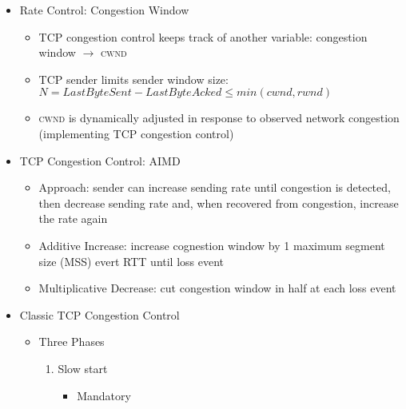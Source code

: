 \begin{itemize}
  \item Rate Control: Congestion Window

    \begin{itemize}

      \item TCP congestion control keeps track of another variable: congestion window $\to$ \textsc{cwnd}

      \item TCP sender limits sender window size: $N=LastByteSent-LastByteAcked\leq min(cwnd,rwnd)$

      \item \textsc{cwnd} is dynamically adjusted in response to observed network congestion (implementing TCP congestion control)

    \end{itemize}

  \item TCP Congestion Control: AIMD

    \begin{itemize}

      \item Approach: sender can increase sending rate until congestion is detected, then decrease sending rate and, when recovered from congestion, increase the rate again

      \item Additive Increase: increase cognestion window by 1 maximum segment size (MSS) evert RTT until loss event

      \item Multiplicative Decrease: cut congestion window in half at each loss event

    \end{itemize}
    
  \item Classic TCP Congestion Control

    \begin{itemize}

      \item Three Phases

        \begin{enumerate}

          \item Slow start

            \begin{itemize}

              \item Mandatory


\end{itemize}
\end{enumerate}
\end{itemize}
\end{itemize}
